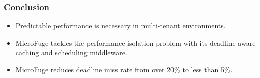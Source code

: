 \documentclass{beamer}
\newcommand{\myv}{\vspace{3 mm}}
\begin{document}

\begin{frame}
  \frametitle{Conclusion}
  \begin{itemize}
  \item Predictable performance is necessary in multi-tenant environments.
    \myv
  \item MicroFuge tackles the performance isolation problem with its
    deadline-aware caching and scheduling middleware.
    \myv
  \item MicroFuge reduces deadline miss rate from over 20\% to
    less than 5\%.
  \end{itemize}
\end{frame}
\end{document}
